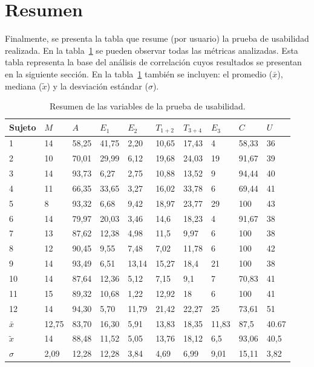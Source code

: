  
\section{Resumen}

Finalmente, se presenta la tabla que resume (por usuario) la prueba de usabilidad realizada. 
En la tabla~\ref{sec:tabla-resumen-prueba} se pueden observar todas las m\'etricas analizadas.
Esta tabla representa la base del an\'alisis de correlaci\'on cuyos resultados se presentan
en la siguiente secci\'on. En la tabla~\ref{sec:tabla-resumen-prueba} tambi\'en se incluyen: el
promedio ($\bar{x}$), mediana ($\widetilde{x}$) y la desviaci\'on est\'andar ($\sigma$).

\begin{table}[H]
\centering
\footnotesize
\begin{tabular}{|p{1.4cm}|p{1.1cm}|p{1.1cm}|p{1.1cm}|p{1.1cm}|p{1.1cm}|p{1.1cm}|p{1.1cm}|p{1.1cm}|p{1.1cm}|}
\hline
Sujeto &  $M$  &   $A$  &   $E_1$ &  $E_2$  &  $T_{1+2}$  & $T_{3+4}$ & $E_3$ & $C$ & $U$ \\
\hline 
1  & 14 &  58,25 & 41,75 & 2,20  & 10,65 & 17,43 & 4  & 58,33 & 36 \\
2  & 10 &  70,01 & 29,99 & 6,12  & 19,68 & 24,03 & 19 & 91,67 & 39 \\
3  & 14 &  93,73 & 6,27  & 2,75  & 10,88 & 13,52 & 9  & 94,44 & 40 \\
4  & 11 &  66,35 & 33,65 & 3,27  & 16,02 & 33,78 & 6  & 69,44 & 41 \\
5  & 8  &  93,32 & 6,68  & 9,42  & 18,97 & 23,77 & 29 & 100   & 43 \\
6  & 14 &  79,97 & 20,03 & 3,46  & 14,6  & 18,23 & 4  & 91,67 & 38 \\
7  & 13 &  87,62 & 12,38 & 4,98  & 11,5  & 9,97  & 6  & 100   & 38 \\
8  & 12 &  90,45 & 9,55  & 7,48  & 7,02  & 11,78 & 6  & 100   & 42 \\
9  & 14 &  93,49 & 6,51  & 13,14 & 15,27 & 18,4  & 21 & 100   & 38 \\
10 & 14 & 87,64 & 12,36 & 5,12  & 7,15  & 9,1   & 7  & 70,83  & 41 \\
11 & 15 & 89,32 & 10,68 & 1,22  & 12,92 & 18      & 6  & 100  & 41 \\
12 & 14 & 94,30 & 5,70  & 11,79 & 21,42 & 22,27 & 25 & 73,61  & 51 \\
\hline 
$\bar{x}$  & 12,75 & 83,70 & 16,30 & 5,91 & 13,83  & 18,35  & 11,83 & 87,5  & 40.67 \\
$\widetilde{x}$   &  14  & 88,48  &  11,52  &  5,05  &  13,76  &  18,12 & 6,5  &  93,06  &  40,5 \\
$\sigma$  & 2,09  &  12,28  & 12,28  &  3,84  &  4,69  & 6,99 &  9,01  &  15,11  &  3,82 \\
\hline
\end{tabular}
\caption{Resumen de las variables de la prueba de usabilidad.}
\label{sec:tabla-resumen-prueba}
\end{table}

